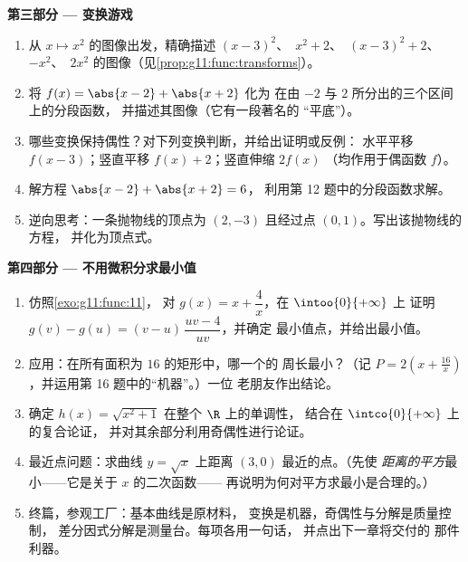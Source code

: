 \begin{problem}
\medskip
\noindent\textbf{第三部分 --- 变换游戏}
\begin{enumerate}[resume]
  \item 从 $x \mapsto x^2$ 的图像出发，精确描述
        $(x - 3)^2$、\ $x^2 + 2$、\
        $(x - 3)^2 + 2$、\ $-x^2$、\ $2x^2$
        的图像（见\cref{prop:g11:func:transforms}）。
  \item 将 $f(x) = \abs{x - 2} + \abs{x + 2}$ 化为
        在由 $-2$ 与 $2$ 所分出的三个区间上的分段函数，
        并描述其图像（它有一段著名的
        “平底”）。
  \item 哪些变换保持偶性？对下列变换判断，并给出证明或反例：
        水平平移 $f(x - 3)$；竖直平移
        $f(x) + 2$；竖直伸缩 $2 f(x)$
        （均作用于偶函数 $f$）。
  \item 解方程 $\abs{x - 2} + \abs{x + 2} = 6$，
        利用第 12 题中的分段函数求解。
  \item 逆向思考：一条抛物线的顶点为 $(2, -3)$
        且经过点 $(0, 1)$。写出该抛物线的方程，
        并化为顶点式。
\end{enumerate}

\medskip
\noindent\textbf{第四部分 --- 不用微积分求最小值}
\begin{enumerate}[resume]
  \item 仿照\cref{exo:g11:func:11}，
        对 $g(x) = x + \dfrac4x$，在 $\intoo{0}{+\infty}$ 上
        证明 $g(v) - g(u) = (v - u)\,\dfrac{uv - 4}{uv}$，并确定
        最小值点，并给出最小值。
  \item 应用：在所有面积为 $16$ 的矩形中，哪一个的
        周长最小？（记 $P = 2\left(x +
        \frac{16}{x}\right)$，并运用第 16 题中的“机器”。）一位
        老朋友作出结论。
  \item 确定
        $h(x) = \sqrt{x^2 + 1}$ 在整个 $\R$ 上的单调性，
        结合在 $\intco{0}{+\infty}$ 上的复合论证，
        并对其余部分利用奇偶性进行论证。
  \item 最近点问题：求曲线
        $y = \sqrt x$ 上距离 $(3, 0)$ 最近的点。（先使
        \emph{距离的平方}最小——它是关于 $x$ 的二次函数——
        再说明为何对平方求最小是合理的。）
  \item 终篇，参观工厂：基本曲线是原材料，
        变换是机器，奇偶性与分解是质量控制，
        差分因式分解是测量台。每项各用一句话，
        并点出下一章将交付的
        那件利器。
\end{enumerate}
\end{problem}
